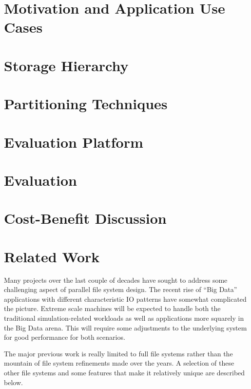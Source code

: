 \documentclass{sig-alt-gov2}
\begin{document}
\section{Motivation and Application Use Cases}
\label{motivation}


\section{Storage Hierarchy}
\label{storage-h}


\section{Partitioning Techniques}
\label{details}



\section{Evaluation Platform}
\label{hardware}


\section{Evaluation}
\label{performance}


\section{Cost-Benefit Discussion}
\label{discussion}



\section{Related Work}
\label{related-work}

Many projects over the last couple of decades have sought to address some
challenging aspect of parallel file system design. The recent rise of ``Big
Data'' applications with different characteristic IO patterns have somewhat
complicated the picture. Extreme scale machines will be expected to handle both
the traditional simulation-related workloads as well as applications more
squarely in the Big Data arena. This will require some adjustments to the
underlying system for good performance for both scenarios.

The major previous work is really limited to full file systems rather than the
mountain of file system refinements made over the years. A selection of these
other file systems and some features that make it relatively unique are
described below.
\end{document}
